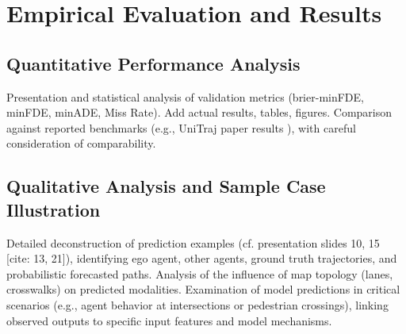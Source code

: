 
\chapter{Empirical Evaluation and Results}
\label{ch:results}

\section{Quantitative Performance Analysis}
\label{sec:results_quantitative}
Presentation and statistical analysis of validation metrics (brier-minFDE, minFDE, minADE, Miss Rate). Add actual results, tables, figures.
Comparison against reported benchmarks (e.g., UniTraj paper results ), with careful consideration of comparability.

\section{Qualitative Analysis and Sample Case Illustration}
\label{sec:results_qualitative}
Detailed deconstruction of prediction examples (cf. presentation slides 10, 15 [cite: 13, 21]), identifying ego agent, other agents, ground truth trajectories, and probabilistic forecasted paths. Analysis of the influence of map topology (lanes, crosswalks) on predicted modalities.
Examination of model predictions in critical scenarios (e.g., agent behavior at intersections or pedestrian crossings), linking observed outputs to specific input features and model mechanisms.
